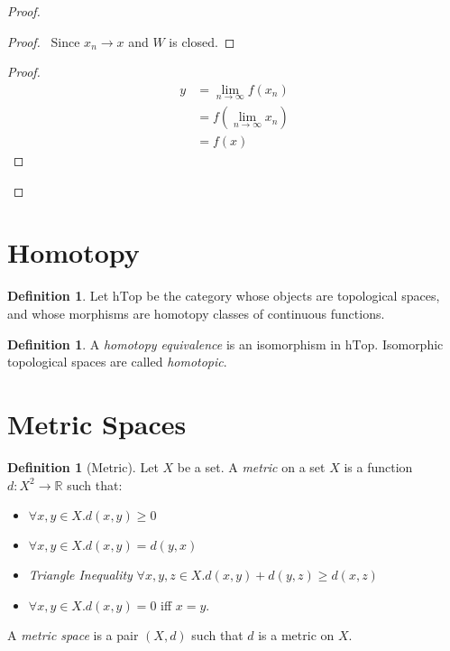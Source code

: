 \documentclass{book}
\let\qed\relax
\theoremstyle{definition}
\newtheorem{df}[ax]{Definition}
\begin{document}
\begin{proof}
\pf
{}
\begin{proof}
	\pf\ Since $x_n \rightarrow x$ and $W$ is closed.
\end{proof}
\begin{proof}
	\pf
	\begin{align*}
		y & = \lim_{n \rightarrow \infty} f(x_n) \\
		& = f \left( \lim_{n \rightarrow \infty} x_n \right) \\
		& = f(x)
	\end{align*}
\end{proof}
\qed
\end{proof}

\section{Homotopy}

\begin{df}
Let $\mathrm{hTop}$ be the category whose objects are topological spaces, and whose morphisms are homotopy classes of continuous functions.
\end{df}

\begin{df}
A \emph{homotopy equivalence} is an isomorphism in $\mathrm{hTop}$. Isomorphic topological spaces are called \emph{homotopic}.
\end{df}

\section{Metric Spaces}

\begin{df}[Metric]
Let $X$ be a set. A \emph{metric} on a set $X$ is a function $d : X^2 \rightarrow \mathbb{R}$ such that:
\begin{itemize}
\item $\forall x,y \in X. d(x,y) \geq 0$
\item $\forall x,y \in X. d(x,y) = d(y,x)$
\item \emph{Triangle Inequality} $\forall x,y,z \in X. d(x,y) + d(y,z) \geq d(x,z)$
\item $\forall x,y \in X. d(x,y) = 0$ iff $x = y$.
\end{itemize}
A \emph{metric space} is a pair $(X,d)$ such that $d$ is a metric on $X$.
\end{df}
\end{document}
